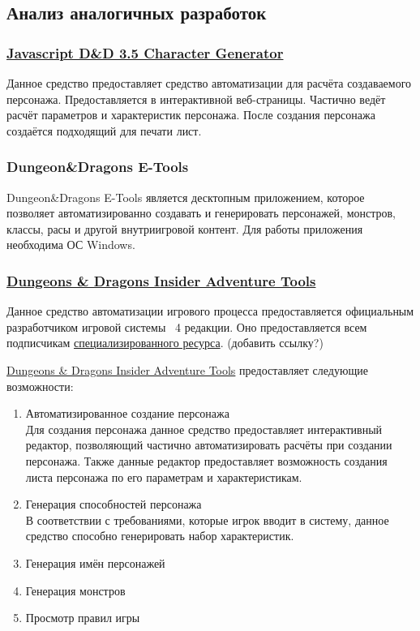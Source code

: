 \subsection{Анализ аналогичных разработок}


\subsubsection{\href{http://www.pathguy.com/cg35.htm}{Javascript D\&D 3.5 Character Generator}}
Данное средство предоставляет средство автоматизации для расчёта создаваемого персонажа. Предоставляется в интерактивной веб-страницы. Частично ведёт расчёт параметров и характеристик персонажа. После создания персонажа создаётся подходящий для печати лист.


\subsubsection{Dungeon\&Dragons E-Tools}
Dungeon\&Dragons E-Tools является десктопным приложением, которое позволяет автоматизированно создавать и генерировать персонажей, монстров, классы, расы и другой внутриигровой контент. Для работы приложения необходима ОС Windows.


\subsubsection{\href{http://www.wizards.com/dnd/Tool.aspx?x=dnd/4new/tool/adventuretools}{Dungeons \& Dragons Insider Adventure Tools}}
Данное средство автоматизации игрового процесса предоставляется официальным разработчиком игровой системы \dnd\ 4 редакции. Оно предоставляется всем подписчикам \href{http://www.wizards.com/dnd}{специализированного ресурса}. (добавить ссылку?)

\href{http://www.wizards.com/dnd/Tool.aspx?x=dnd/4new/tool/adventuretools}{Dungeons \& Dragons Insider Adventure Tools} предоставляет следующие возможности:
\begin{enumerate}
\item Автоматизированное создание персонажа\\
Для создания персонажа данное средство предоставляет интерактивный редактор, позволяющий частично автоматизировать расчёты при создании персонажа. Также данные редактор предоставляет возможность создания листа персонажа по его параметрам и характеристикам.
\item Генерация способностей персонажа\\
В соответствии с требованиями, которые игрок вводит в систему, данное средство способно генерировать набор характеристик.
\item Генерация имён персонажей
\item Генерация монстров
\item Просмотр правил игры
\end{enumerate}


